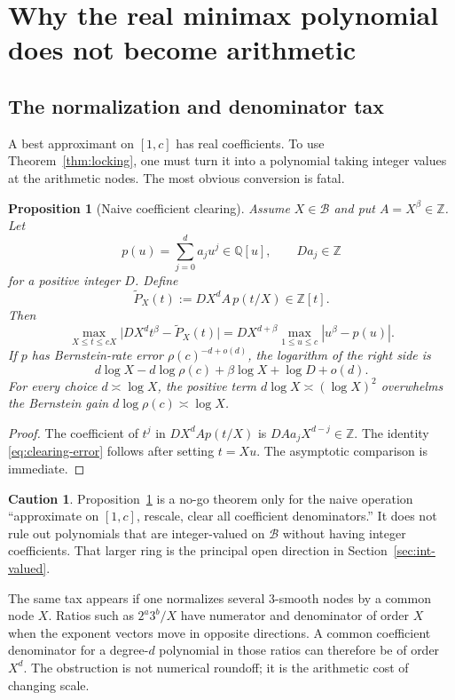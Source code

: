 \documentclass[11pt,oneside]{article}
\newtheorem{proposition}[theorem]{Proposition}
\theoremstyle{definition}
\newtheorem{warning}[theorem]{Caution}
\theoremstyle{remark}
\newcommand{\Z}{\mathbb Z}
\newcommand{\Q}{\mathbb Q}
\newcommand{\Bsem}{\mathcal B}
\begin{document}
\section{Why the real minimax polynomial does not become arithmetic}
\label{sec:integerization}

\subsection{The normalization and denominator tax}

A best approximant on $[1,c]$ has real coefficients.  To use
Theorem~\ref{thm:locking}, one must turn it into a polynomial taking integer values at the
arithmetic nodes.  The most obvious conversion is fatal.

\begin{proposition}[Naive coefficient clearing]
\label{prop:clearing-tax}
Assume $X\in\Bsem$ and put $A=X^\beta\in\Z$.  Let
\[
 p(u)=\sum_{j=0}^da_ju^j\in\Q[u],
 \qquad Da_j\in\Z
\]
for a positive integer $D$.  Define
\[
 \widetilde P_X(t):=DX^dA\,p(t/X)\in\Z[t].
\]
Then
\begin{equation}
 \max_{X\le t\le cX}
 \bigl|DX^dt^\beta-\widetilde P_X(t)\bigr|
 =DX^{d+\beta}\max_{1\le u\le c}|u^\beta-p(u)|.
 \label{eq:clearing-error}
\end{equation}
If $p$ has Bernstein-rate error $\rho(c)^{-d+o(d)}$, the logarithm of the right side is
\[
 d\log X-d\log\rho(c)+\beta\log X+\log D+o(d).
\]
For every choice $d\asymp\log X$, the positive term $d\log X\asymp(\log X)^2$ overwhelms the
Bernstein gain $d\log\rho(c)\asymp\log X$.
\end{proposition}

\begin{proof}
The coefficient of $t^j$ in $DX^dA p(t/X)$ is
$DAa_jX^{d-j}\in\Z$.  The identity \eqref{eq:clearing-error} follows after setting $t=Xu$.
The asymptotic comparison is immediate.
\end{proof}

\begin{warning}
Proposition~\ref{prop:clearing-tax} is a no-go theorem only for the naive operation
``approximate on $[1,c]$, rescale, clear all coefficient denominators.''  It does not rule out
polynomials that are integer-valued on $\Bsem$ without having integer coefficients.  That
larger ring is the principal open direction in Section~\ref{sec:int-valued}.
\end{warning}

The same tax appears if one normalizes several $3$-smooth nodes by a common node $X$.  Ratios
such as $2^a3^b/X$ have numerator and denominator of order $X$ when the exponent vectors move
in opposite directions.  A common coefficient denominator for a degree-$d$ polynomial in
those ratios can therefore be of order $X^d$.  The obstruction is not numerical roundoff; it
is the arithmetic cost of changing scale.
\end{document}
